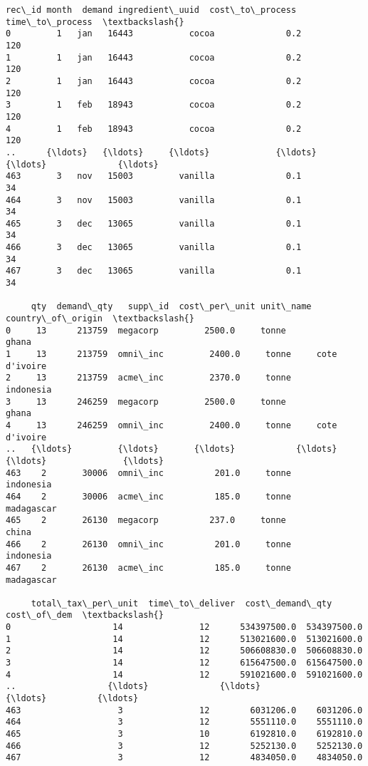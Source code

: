 \documentclass[11pt]{article}
\makeatletter
\newcommand{\boxspacing}{\kern\kvtcb@left@rule\kern\kvtcb@boxsep}
\newcommand{\prompt}[4]{
        {\ttfamily\llap{{\color{#2}[#3]:\hspace{3pt}#4}}\vspace{-\baselineskip}}
    }
\makeatother
\begin{document}
            \begin{tcolorbox}[breakable, size=fbox, boxrule=.5pt, pad at break*=1mm, opacityfill=0]
\prompt{Out}{outcolor}{16}{\boxspacing}
\begin{Verbatim}[commandchars=\\\{\}]
     rec\_id month  demand ingredient\_uuid  cost\_to\_process  time\_to\_process  \textbackslash{}
0         1   jan   16443           cocoa              0.2              120
1         1   jan   16443           cocoa              0.2              120
2         1   jan   16443           cocoa              0.2              120
3         1   feb   18943           cocoa              0.2              120
4         1   feb   18943           cocoa              0.2              120
..      {\ldots}   {\ldots}     {\ldots}             {\ldots}              {\ldots}              {\ldots}
463       3   nov   15003         vanilla              0.1               34
464       3   nov   15003         vanilla              0.1               34
465       3   dec   13065         vanilla              0.1               34
466       3   dec   13065         vanilla              0.1               34
467       3   dec   13065         vanilla              0.1               34

     qty  demand\_qty   supp\_id  cost\_per\_unit unit\_name country\_of\_origin  \textbackslash{}
0     13      213759  megacorp         2500.0     tonne             ghana
1     13      213759  omni\_inc         2400.0     tonne     cote d'ivoire
2     13      213759  acme\_inc         2370.0     tonne         indonesia
3     13      246259  megacorp         2500.0     tonne             ghana
4     13      246259  omni\_inc         2400.0     tonne     cote d'ivoire
..   {\ldots}         {\ldots}       {\ldots}            {\ldots}       {\ldots}               {\ldots}
463    2       30006  omni\_inc          201.0     tonne         indonesia
464    2       30006  acme\_inc          185.0     tonne        madagascar
465    2       26130  megacorp          237.0     tonne             china
466    2       26130  omni\_inc          201.0     tonne         indonesia
467    2       26130  acme\_inc          185.0     tonne        madagascar

     total\_tax\_per\_unit  time\_to\_deliver  cost\_demand\_qty  cost\_of\_dem  \textbackslash{}
0                    14               12      534397500.0  534397500.0
1                    14               12      513021600.0  513021600.0
2                    14               12      506608830.0  506608830.0
3                    14               12      615647500.0  615647500.0
4                    14               12      591021600.0  591021600.0
..                  {\ldots}              {\ldots}              {\ldots}          {\ldots}
463                   3               12        6031206.0    6031206.0
464                   3               12        5551110.0    5551110.0
465                   3               10        6192810.0    6192810.0
466                   3               12        5252130.0    5252130.0
467                   3               12        4834050.0    4834050.0


\end{Verbatim}
\end{tcolorbox}
\end{document}
